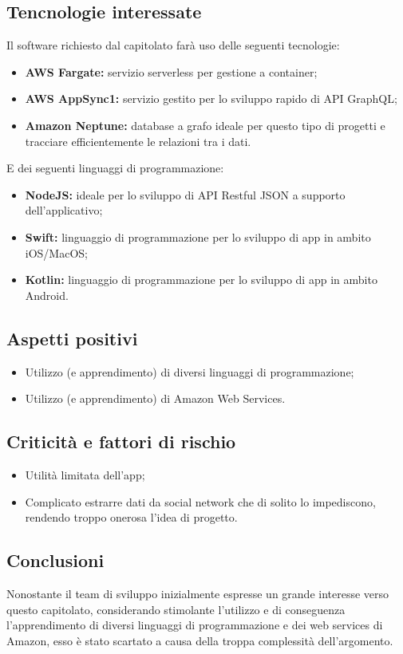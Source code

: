 \subsection{Tencnologie interessate}
    Il software richiesto dal capitolato farà uso delle seguenti tecnologie:
    \begin{itemize}
        \item \textbf{AWS Fargate\glo:} servizio serverless per gestione a container;
        \item \textbf{AWS AppSync1\glo:} servizio gestito per lo sviluppo rapido di API GraphQL;
        \item \textbf{Amazon Neptune\glo:} database a grafo ideale per questo tipo di progetti e tracciare efficientemente le relazioni tra i dati.
    \end{itemize}
    E dei seguenti linguaggi di programmazione:
    \begin{itemize}
        \item \textbf{NodeJS\glo:} ideale per lo sviluppo di API Restful JSON a supporto dell’applicativo;
        \item \textbf{Swift\glo:} linguaggio di programmazione per lo sviluppo di app in ambito iOS/MacOS;
        \item \textbf{Kotlin\glo:} linguaggio di programmazione per lo sviluppo di app in ambito Android.
    \end{itemize}

\subsection{Aspetti positivi}
    \begin{itemize}
        \item Utilizzo (e apprendimento) di diversi linguaggi di programmazione;
        \item Utilizzo (e apprendimento) di Amazon Web Services.
    \end{itemize}

\subsection{Criticità e fattori di rischio}
    \begin{itemize}
        \item Utilità limitata dell'app;
        \item Complicato estrarre dati da social network che di solito lo impediscono, rendendo troppo onerosa l'idea di progetto.
    \end{itemize}
    
\subsection{Conclusioni}
Nonostante il team di sviluppo inizialmente espresse un grande interesse verso questo capitolato, considerando stimolante l'utilizzo e di conseguenza l'apprendimento di diversi linguaggi di programmazione e dei web services di Amazon, esso è stato scartato a causa della troppa complessità dell'argomento.
